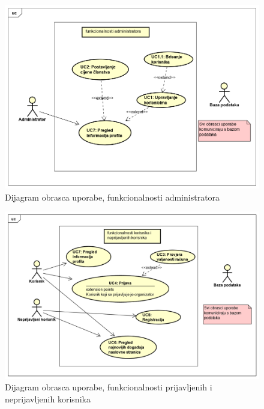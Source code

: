 					\begin{figure}[H]
						\includegraphics[width=\linewidth]{slike/funkcionalnostiAdministratora.PNG}
						\centering
						\caption{Dijagram obrasca uporabe, funkcionalnosti administratora}
						\label{fig:UCdijagram1}
					\end{figure}
					
					\begin{figure}[H]
						\includegraphics[width=\linewidth]{slike/funkcionalnostSvihKorisnika.PNG}
						\centering
						\caption{Dijagram obrasca uporabe, funkcionalnosti prijavljenih i neprijavljenih korisnika}
						\label{fig:UCdijagram2}
					\end{figure}
					
